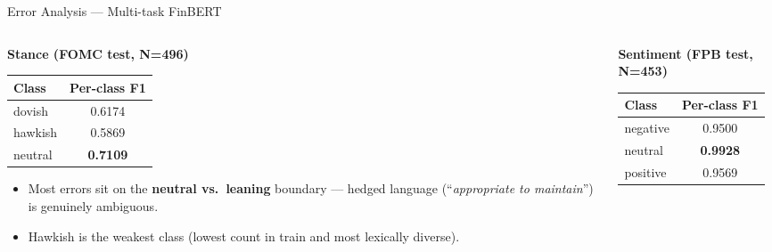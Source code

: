 \documentclass[10pt, aspectratio=169]{beamer}
\begin{document}
\begin{frame}{Error Analysis --- Multi-task FinBERT}
    \begin{columns}[T]
        \begin{column}{0.50\textwidth}
            \textbf{Stance (FOMC test, N=496)}
            \centering
            \vspace{0.2em}

            {\small
            \begin{tabular}{lc}
                \toprule
                \textbf{Class} & \textbf{Per-class F1} \\
                \midrule
                dovish         & 0.6174 \\
                hawkish        & 0.5869 \\
                \rowcolor{UNSWYellow!30}
                neutral        & \textbf{0.7109} \\
                \bottomrule
            \end{tabular}
            }

            \vspace{0.4em}
            {\footnotesize
            \begin{itemize}\setlength{\itemsep}{1pt}
                \item Most errors sit on the \textbf{neutral vs.\ leaning} boundary --- hedged language (``\textit{appropriate to maintain}'') is genuinely ambiguous.
                \item Hawkish is the weakest class (lowest count in train and most lexically diverse).
            \end{itemize}
            }
        \end{column}
        \begin{column}{0.48\textwidth}
            \textbf{Sentiment (FPB test, N=453)}
            \centering
            \vspace{0.2em}

            {\small
            \begin{tabular}{lc}
                \toprule
                \textbf{Class} & \textbf{Per-class F1} \\
                \midrule
                negative       & 0.9500 \\
                \rowcolor{UNSWYellow!30}
                neutral        & \textbf{0.9928} \\
                positive       & 0.9569 \\
                \bottomrule
            \end{tabular}
            }


\end{column}
\end{columns}
\end{frame}
\end{document}
